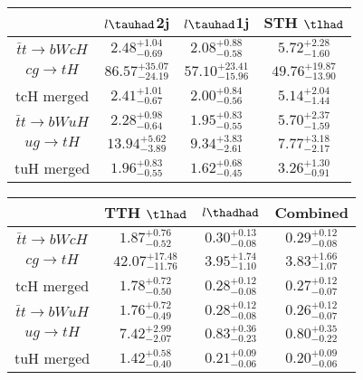 \centering
\begin{tabular}{|c|c|c|c|} \hline
 & $l\tauhad$2j & $l\tauhad$1j & STH $\tlhad$\\\hline
$\bar{t}t\to bWcH$ & $2.48^{+1.04}_{-0.69}$ & $2.08^{+0.88}_{-0.58}$ & $5.72^{+2.28}_{-1.60}$\\\hline
$cg\to tH$ & $86.57^{+35.07}_{-24.19}$ & $57.10^{+23.41}_{-15.96}$ & $49.76^{+19.87}_{-13.90}$\\\hline
tcH merged & $2.41^{+1.01}_{-0.67}$ & $2.00^{+0.84}_{-0.56}$ & $5.14^{+2.04}_{-1.44}$\\\hline
$\bar{t}t\to bWuH$ & $2.28^{+0.98}_{-0.64}$ & $1.95^{+0.83}_{-0.55}$ & $5.70^{+2.37}_{-1.59}$\\\hline
$ug\to tH$ & $13.94^{+5.62}_{-3.89}$ & $9.34^{+3.83}_{-2.61}$ & $7.77^{+3.18}_{-2.17}$\\\hline
tuH merged & $1.96^{+0.83}_{-0.55}$ & $1.62^{+0.68}_{-0.45}$ & $3.26^{+1.30}_{-0.91}$\\\hline
\end{tabular}
\begin{tabular}{|c|c|c|c|} \hline
 & TTH $\tlhad$ & $l\thadhad$ & Combined\\\hline
$\bar{t}t\to bWcH$ & $1.87^{+0.76}_{-0.52}$ & $0.30^{+0.13}_{-0.08}$ & $0.29^{+0.12}_{-0.08}$\\\hline
$cg\to tH$ & $42.07^{+17.48}_{-11.76}$ & $3.95^{+1.74}_{-1.10}$ & $3.83^{+1.66}_{-1.07}$\\\hline
tcH merged & $1.78^{+0.72}_{-0.50}$ & $0.28^{+0.12}_{-0.08}$ & $0.27^{+0.12}_{-0.07}$\\\hline
$\bar{t}t\to bWuH$ & $1.76^{+0.72}_{-0.49}$ & $0.28^{+0.12}_{-0.08}$ & $0.26^{+0.12}_{-0.07}$\\\hline
$ug\to tH$ & $7.42^{+2.99}_{-2.07}$ & $0.83^{+0.36}_{-0.23}$ & $0.80^{+0.35}_{-0.22}$\\\hline
tuH merged & $1.42^{+0.58}_{-0.40}$ & $0.21^{+0.09}_{-0.06}$ & $0.20^{+0.09}_{-0.06}$\\\hline
\end{tabular}
